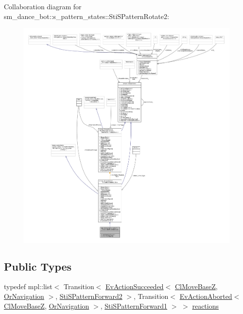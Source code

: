 Collaboration diagram for sm\+\_\+dance\+\_\+bot\+:\+:s\+\_\+pattern\+\_\+states\+:\+:Sti\+S\+Pattern\+Rotate2\+:
\nopagebreak
\begin{figure}[H]
\begin{center}
\leavevmode
\includegraphics[width=350pt]{structsm__dance__bot_1_1s__pattern__states_1_1StiSPatternRotate2__coll__graph}
\end{center}
\end{figure}
\subsection*{Public Types}
\begin{DoxyCompactItemize}
\item 
typedef mpl\+::list$<$ Transition$<$ \hyperlink{structsmacc_1_1default__events_1_1EvActionSucceeded}{Ev\+Action\+Succeeded}$<$ \hyperlink{classcl__move__base__z_1_1ClMoveBaseZ}{Cl\+Move\+BaseZ}, \hyperlink{classsm__dance__bot_1_1OrNavigation}{Or\+Navigation} $>$, \hyperlink{structsm__dance__bot_1_1s__pattern__states_1_1StiSPatternForward2}{Sti\+S\+Pattern\+Forward2} $>$, Transition$<$ \hyperlink{structsmacc_1_1default__events_1_1EvActionAborted}{Ev\+Action\+Aborted}$<$ \hyperlink{classcl__move__base__z_1_1ClMoveBaseZ}{Cl\+Move\+BaseZ}, \hyperlink{classsm__dance__bot_1_1OrNavigation}{Or\+Navigation} $>$, \hyperlink{structsm__dance__bot_1_1s__pattern__states_1_1StiSPatternForward1}{Sti\+S\+Pattern\+Forward1} $>$ $>$ \hyperlink{structsm__dance__bot_1_1s__pattern__states_1_1StiSPatternRotate2_a8408b6f8b356b536b1ebe328ba6f7b02}{reactions}
\end{DoxyCompactItemize}
